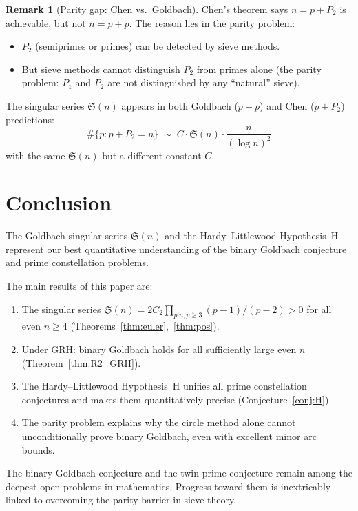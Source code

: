\documentclass[12pt,a4paper]{amsart}
\theoremstyle{definition}
\newtheorem{remark}[theorem]{Remark}
\begin{document}
\begin{remark}[Parity gap: Chen vs.\ Goldbach]
  Chen's theorem says $n = p + P_2$ is achievable, but not $n = p + p$.
  The reason lies in the parity problem:
  \begin{itemize}
    \item $P_2$ (semiprimes or primes) can be detected by sieve methods.
    \item But sieve methods cannot distinguish $P_2$ from primes alone
      (the parity problem: $P_1$ and $P_2$ are not distinguished by
      any ``natural'' sieve).
  \end{itemize}
  The singular series $\mathfrak{S}(n)$ appears in both Goldbach ($p+p$)
  and Chen ($p + P_2$) predictions:
  \[
    \#\{p : p + P_2 = n\} \;\sim\; C \cdot \mathfrak{S}(n) \cdot \frac{n}{(\log n)^2}
  \]
  with the same $\mathfrak{S}(n)$ but a different constant $C$.
\end{remark}

\section{Conclusion}

The Goldbach singular series $\mathfrak{S}(n)$ and the Hardy--Littlewood
Hypothesis~H represent our best quantitative understanding of the binary
Goldbach conjecture and prime constellation problems.

The main results of this paper are:
\begin{enumerate}
  \item The singular series $\mathfrak{S}(n) = 2C_2 \prod_{p|n, p\geq 3}(p-1)/(p-2) > 0$
    for all even $n \geq 4$ (Theorems~\ref{thm:euler},~\ref{thm:pos}).
  \item Under GRH: binary Goldbach holds for all sufficiently large even $n$
    (Theorem~\ref{thm:R2_GRH}).
  \item The Hardy--Littlewood Hypothesis~H unifies all prime constellation
    conjectures and makes them quantitatively precise (Conjecture~\ref{conj:H}).
  \item The parity problem explains why the circle method alone cannot
    unconditionally prove binary Goldbach, even with excellent minor arc bounds.
\end{enumerate}

The binary Goldbach conjecture and the twin prime conjecture remain
among the deepest open problems in mathematics.  Progress toward them
is inextricably linked to overcoming the parity barrier in sieve theory.
\end{document}
